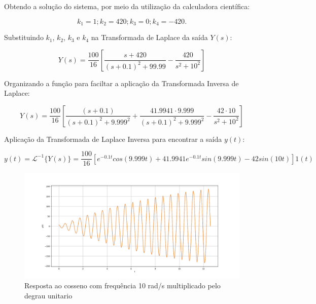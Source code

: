 \documentclass[10pt]{article}
\begin{document}
\quad Obtendo a solução do sistema, por meio da utilização da calculadora científica:

\begin{equation}
    k_1 = 1; k_2 = 420; k_3 = 0; k_4 = -420.
\end{equation}

\quad Substituindo $k_1$, $k_2$, $k_3$ e $k_4$ na Transformada de Laplace da saída $Y(s)$:

\begin{equation}
    Y(s) = \frac{100}{16} \left[ \frac{s+420}{(s + 0.1)^2 + 99.99} - \frac{420}{s^2 + 10^2} \right]
\end{equation}

\quad Organizando a função para faciltar a aplicação da Transformada Inversa de Laplace:

\begin{equation}
    Y(s) = \frac{100}{16} \left[ \frac{(s + 0.1)}{(s + 0.1)^2 + 9.999^2} + \frac{41.9941 \cdot 9.999}{(s + 0.1)^2 + 9.999^2} - \frac{42 \cdot 10}{s^2 + 10^2} \right]
\end{equation}

\quad Aplicação da Transformada de Laplace Inversa para encontrar a saída $y(t)$:

\begin{equation}
    y(t) = \mathcal{L}^{-1} \{Y(s) \} = \frac{100}{16} \left[ e^{-0.1t}cos(9.999t) + 41.9941e^{-0.1t}sin(9.999t) - 42sin(10t) \right] 1(t)
\end{equation}

\begin{figure}[h]
    \centering
    \includegraphics[scale=0.4]{questao3.png}
    \caption{Resposta ao cosseno com frequência 10 rad/s multiplicado pelo degrau unitario}
\end{figure}
\end{document}
